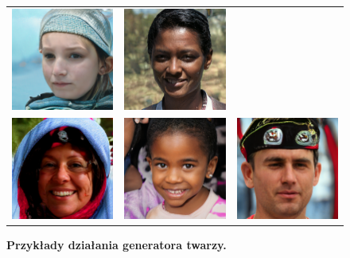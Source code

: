 \begin{figure}[H]
\begin{center}
\begin{tabular}{ccc}
        \includegraphics[width=.3\linewidth]{img/gen/5.png} &
        \includegraphics[width=.3\linewidth]{img/gen/6.png} \\
        \includegraphics[width=.3\linewidth]{img/gen/7.png} &
        \includegraphics[width=.3\linewidth]{img/gen/8.png} &
        \includegraphics[width=.3\linewidth]{img/gen/9.png} \\
      \end{tabular}
      \end{center}
      \caption{{\bf Przykłady działania generatora twarzy.}}
      \label{fig:generator_twarzy}
    \end{figure}

